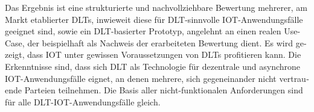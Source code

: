 \begin{otherlanguage}{ngerman}
	Das Ergebnis ist eine strukturierte und nachvollziehbare Bewertung mehrerer, am Markt etablierter DLTs, inwieweit diese für DLT-sinnvolle IOT-Anwendungsfälle geeignet sind, sowie ein DLT-basierter Prototyp, angelehnt an einen realen Use-Case, der beispielhaft als Nachweis der erarbeiteten Bewertung dient. Es wird gezeigt, dass IOT unter gewissen Voraussetzungen von DLTs profitieren kann. Die Erkenntnisse sind, dass sich DLT als Technologie für dezentrale und asynchrone IOT-Anwendungsfälle eignet, an denen mehrere, sich gegeneinander nicht vertrauende Parteien teilnehmen. Die Basis aller nicht-funktionalen Anforderungen sind für alle \ac{DLT}-\ac{IOT}-Anwendungsfälle gleich.
\end{otherlanguage}
